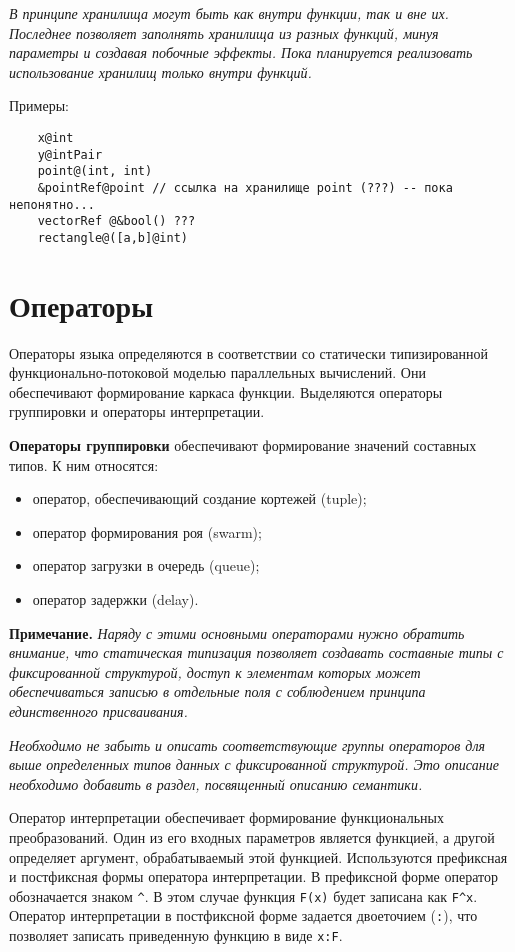 {\textit{В принципе хранилища могут быть как внутри функции, так и вне их. Последнее позволяет заполнять хранилища из разных функций, минуя параметры и создавая побочные эффекты. Пока планируется реализовать использование хранилищ только внутри функций.}

Примеры:

\begin{verbatim}
    x@int
    y@intPair
    point@(int, int)
    &pointRef@point // ссылка на хранилище point (???) -- пока непонятно...
    vectorRef @&bool() ???
    rectangle@([a,b]@int)
\end{verbatim}

\section{Операторы}

Операторы языка определяются в соответствии со статически типизированной функционально-потоковой моделью параллельных вычислений. Они обеспечивают формирование каркаса функции. Выделяются операторы группировки и операторы интерпретации.

\textbf{Операторы группировки} обеспечивают формирование значений составных типов. К ним относятся:

\begin{itemize}
    \item оператор, обеспечивающий создание кортежей (tuple);
    \item оператор формирования роя (swarm);
    \item оператор загрузки в очередь (queue);
    \item оператор задержки (delay).
\end{itemize}

\textbf{Примечание.}
\textit{Наряду с этими основными операторами нужно обратить внимание, что статическая типизация позволяет создавать составные типы с фиксированной структурой, доступ к элементам которых может обеспечиваться записью в отдельные поля с соблюдением принципа единственного присваивания.}

\textit{Необходимо не забыть и описать соответствующие группы операторов для выше определенных типов данных с фиксированной структурой. Это описание необходимо добавить в раздел, посвященный описанию семантики.}

Оператор интерпретации обеспечивает формирование функциональных преобразований. Один из его входных параметров является функцией, а другой определяет аргумент, обрабатываемый этой функцией. Используются префиксная и постфиксная формы оператора интерпретации. В префиксной форме оператор обозначается знаком \verb|^|. В этом случае функция \verb|F(x)| будет записана как \verb|F^x|. Оператор интерпретации в постфиксной форме задается двоеточием (\verb|:|), что позволяет записать приведенную функцию в виде \verb|x:F|.

}
